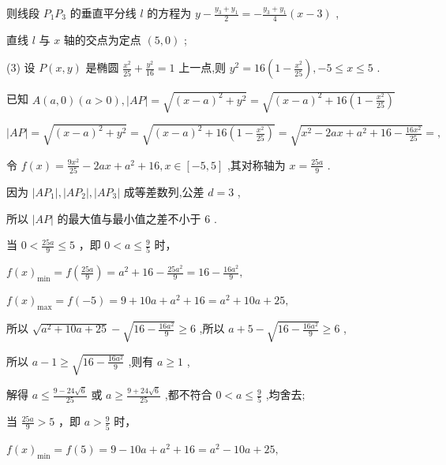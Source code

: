 \documentclass[10pt]{article}
\newcommand*\circled[1]{\tikz[baseline=(char.base)]{\node[shape=circle,draw,inner sep=1.5pt] (char) {\small #1};}}
\begin{document}
则线段 \({P}_{1}{P}_{3}\) 的垂直平分线 \(l\) 的方程为 \(y - \frac{{y}_{3} + {y}_{1}}{2} =  - \frac{{y}_{3} + {y}_{1}}{4}\left( {x - 3}\right)\) ,

直线 \(l\) 与 \(x\) 轴的交点为定点 \(\left( {5,0}\right)\) ;

(3) 设 \(P\left( {x,y}\right)\) 是椭圆 \(\frac{{x}^{2}}{25} + \frac{{y}^{2}}{16} = 1\) 上一点,则 \({y}^{2} = {16}\left( {1 - \frac{{x}^{2}}{25}}\right) , - 5 \leq  x \leq  5\) .

已知 \(A\left( {a,0}\right) \left( {a > 0}\right) ,\left| {AP}\right|  = \sqrt{{\left( x - a\right) }^{2} + {y}^{2}} = \sqrt{{\left( x - a\right) }^{2} + {16}\left( {1 - \frac{{x}^{2}}{25}}\right) }\)

\(\left| {AP}\right|  = \sqrt{{\left( x - a\right) }^{2} + {y}^{2}} = \sqrt{{\left( x - a\right) }^{2} + {16}\left( {1 - \frac{{x}^{2}}{25}}\right) } = \sqrt{{x}^{2} - {2ax} + {a}^{2} + {16} - \frac{{16}{x}^{2}}{25}} = ,\)

令 \(f\left( x\right)  = \frac{9{x}^{2}}{25} - {2ax} + {a}^{2} + {16},x \in  \left\lbrack  {-5,5}\right\rbrack\) ,其对称轴为 \(x = \frac{25a}{9}\) .

因为 \(\left| {A{P}_{1}}\right| ,\left| {A{P}_{2}}\right| ,\left| {A{P}_{3}}\right|\) 成等差数列,公差 \(d = 3\) ,

所以 \(\left| {AP}\right|\) 的最大值与最小值之差不小于 6 .

 \circled{1}  当 \(0 < \frac{25a}{9} \leq  5\) ，即 \(0 < a \leq  \frac{9}{5}\) 时，

\(f{\left( x\right) }_{\min } = f\left( \frac{25a}{9}\right)  = {a}^{2} + {16} - \frac{{25}{a}^{2}}{9} = {16} - \frac{{16}{a}^{2}}{9},\)

\(f{\left( x\right) }_{\max } = f\left( {-5}\right)  = 9 + {10a} + {a}^{2} + {16} = {a}^{2} + {10a} + {25},\)

所以 \(\sqrt{{a}^{2} + {10a} + {25}} - \sqrt{{16} - \frac{{16}{a}^{2}}{9}} \geq  6\) ,所以 \(a + 5 - \sqrt{{16} - \frac{{16}{a}^{2}}{9}} \geq  6\) ,

所以 \(a - 1 \geq  \sqrt{{16} - \frac{{16}{a}^{2}}{9}}\) ,则有 \(a \geq  1\) ,

解得 \(a \leq  \frac{9 - {24}\sqrt{6}}{25}\) 或 \(a \geq  \frac{9 + {24}\sqrt{6}}{25}\) ,都不符合 \(0 < a \leq  \frac{9}{5}\) ,均舍去;

 \circled{2}  当 \(\frac{25a}{9} > 5\) ，即 \(a > \frac{9}{5}\) 时，

\(f{\left( x\right) }_{\min } = f\left( 5\right)  = 9 - {10a} + {a}^{2} + {16} = {a}^{2} - {10a} + {25},\)
\end{document}
